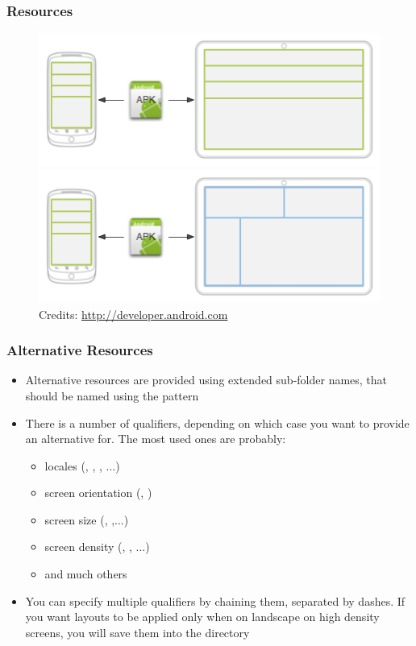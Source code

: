 \begin{frame}
  \frametitle{Resources}
  \begin{figure}[h!]
    \centering
    \includegraphics[height=0.4\textheight]{slides/android-application-resources/resource-no-alternative.png}\\
    \includegraphics[height=0.4\textheight]{slides/android-application-resources/resource-alternative.png}\\
    {
      \tiny
      Credits: \url{http://developer.android.com}
    }
  \end{figure}
\end{frame}

\begin{frame}
  \frametitle{Alternative Resources}
  \begin{itemize}
  \item Alternative resources are provided using extended sub-folder
    names, that should be named using the pattern
  \item There is a number of qualifiers, depending on which case
    you want to provide an alternative for. The most used ones are probably:
    \begin{itemize}
    \item locales (, , , ...)
    \item screen orientation (, )
    \item screen size (, ,...)
    \item screen density (, , ...)
    \item and much others
    \end{itemize}
  \item You can specify multiple qualifiers by chaining them,
    separated by dashes. If you want layouts to be applied only when
    on landscape on high density screens, you will save them into the
    directory 
  \end{itemize}
\end{frame}

